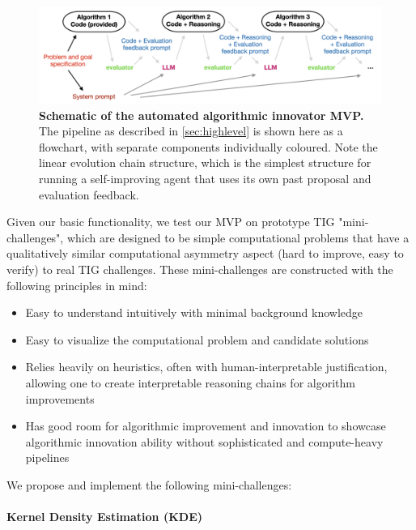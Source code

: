 \documentclass[12pt, legalpaper]{article}
\begin{document}
\begin{figure}[t]
    \centering
    \includegraphics[width=\textwidth]{figures/schematic.png}
    \caption{
    \textbf{Schematic of the automated algorithmic innovator MVP.} 
    The pipeline as described in \autoref{sec:highlevel} is shown here as a flowchart, with separate components individually coloured. 
    Note the linear evolution chain structure, which is the simplest structure for running a self-improving agent that uses its own past proposal and evaluation feedback. 
    }
    \label{fig:schematic}
\end{figure}

Given our basic functionality, we test our MVP on prototype TIG "mini-challenges", which are designed to be simple computational problems that have a qualitatively similar computational asymmetry aspect (hard to improve, easy to verify) to real TIG challenges. 
These mini-challenges are constructed with the following principles in mind: 
%
\begin{itemize}
    \item Easy to understand intuitively with minimal background knowledge
    
    \item Easy to visualize the computational problem and candidate solutions
    
    \item Relies heavily on heuristics, often with human-interpretable justification, allowing one to create interpretable reasoning chains for algorithm improvements
    
    \item Has good room for algorithmic improvement and innovation to showcase algorithmic innovation ability without sophisticated and compute-heavy pipelines
\end{itemize}
%
We propose and implement the following mini-challenges:

\paragraph{Kernel Density Estimation (KDE)}
\end{document}
